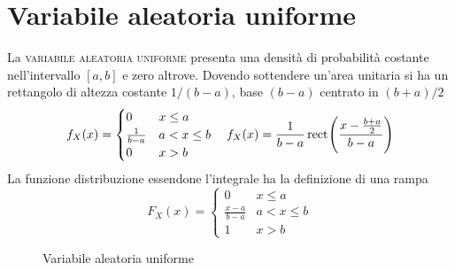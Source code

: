 \section{Variabile aleatoria uniforme}
La \textsc{variabile aleatoria uniforme} presenta una densità di probabilità costante nell'intervallo $[a,b]$ e zero altrove. Dovendo sottendere un'area unitaria si ha un rettangolo di altezza costante $1/(b-a)$, base $(b-a)$ centrato in $(b+a)/2$
\begin{equation}
	f_X(x)=\begin{cases}
		0&x\leq a\\ 
		\frac{1}{b-a}&a<x\leq b\\
		0&x>b
	\end{cases}
	\quad
	f_X(x)=\frac{1}{b-a}\,{\operatorname{rect}}^{}\!\left({\frac{x-\frac{b+a}{2}}{b-a}}\right)
\end{equation}
La funzione distribuzione essendone l'integrale ha la definizione di una rampa
\begin{equation}
	F_X(x)=\begin{cases}
		0&x\leq a\\
		\frac{x-a}{b-a}&a<x\leq b\\
		1&x>b
	\end{cases}
\end{equation}
\begin{figure}[!ht]
	\centering
	\qquad
	\caption{Variabile aleatoria uniforme}
\end{figure}

